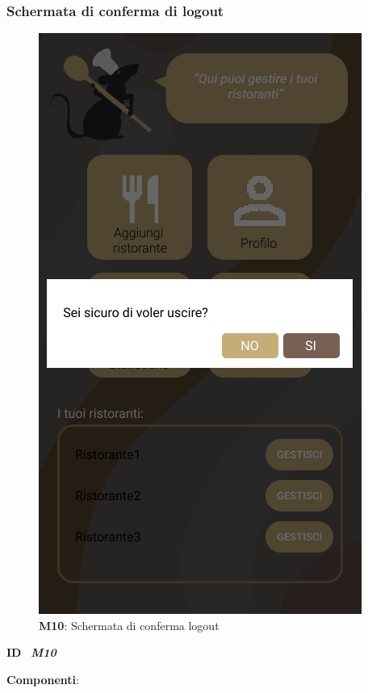         \subsubsection{Schermata di conferma di logout}
          \begin{figure}[H]
            \centering
            \includegraphics[scale=0.5]{assets/Mockup/Mockup_ExitDialog.png}
            \caption*{\textbf{M10}: Schermata di conferma logout}\label{fig:Mockup_ExitDialog}
          \end{figure}

          \begin{flushleft}
            \textbf{ID}   \ \Large{\textit{\textbf{M10}}}
          \end{flushleft}

          \textbf{Componenti}:

